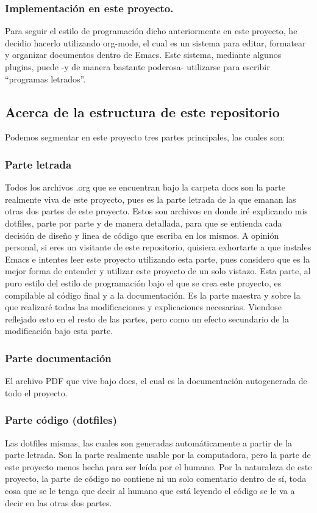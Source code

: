 \documentclass[11pt]{article}
\begin{document}
\subsubsection{Implementación en este proyecto.}
\label{sec:org3ff4afc}
Para seguir el estilo de programación dicho anteriormente en este proyecto, he decidio hacerlo utilizando org-mode, el cual es un sistema para editar, formatear y organizar documentos dentro de Emacs. Este sistema, mediante algunos plugins, puede -y de manera bastante poderosa- utilizarse para escribir ``programas letrados''.
\subsection{Acerca de la estructura de este repositorio}
\label{sec:org9f333b3}
Podemos segmentar en este proyecto tres partes principales, las cuales son:
\subsubsection{Parte letrada}
\label{sec:orgc91e1a4}
Todos los archivos .org que se encuentran bajo la carpeta docs son la parte realmente viva de este proyecto, pues es la parte letrada de la que emanan las otras dos partes de este proyecto.
Estos son archivos en donde iré explicando mis dotfiles, parte por parte y de manera detallada, para que se entienda cada decisión de diseño y linea de código que escriba en los mismos. A opinión personal, si eres un visitante de este repositorio, quisiera exhortarte a que instales Emacs e intentes leer este proyecto utilizando esta parte, pues considero que es la mejor forma de entender y utilizar este proyecto de un solo vistazo. Esta parte, al puro estilo del estilo de programación bajo el que se crea este proyecto, es compilable al código final y a la documentación. Es la parte maestra y sobre la que realizaré todas las modificaciones y explicaciones necesarias. Viendose reflejado esto en el resto de las partes, pero como un efecto secundario de la modificación bajo esta parte.
\subsubsection{Parte documentación}
\label{sec:orge54f2af}
El archivo PDF que vive bajo docs, el cual es la documentación autogenerada de todo el proyecto.
\subsubsection{Parte código (dotfiles)}
\label{sec:org47869d6}
Las dotfiles mismas, las cuales son generadas automáticamente a partir de la parte letrada. Son la parte realmente usable por la computadora, pero la parte de este proyecto menos hecha para ser leída por el humano. Por la naturaleza de este proyecto, la parte de código no contiene ni un solo comentario dentro de sí, toda cosa que se le tenga que decir al humano que está leyendo el código se le va a decir en las otras dos partes.
\end{document}
